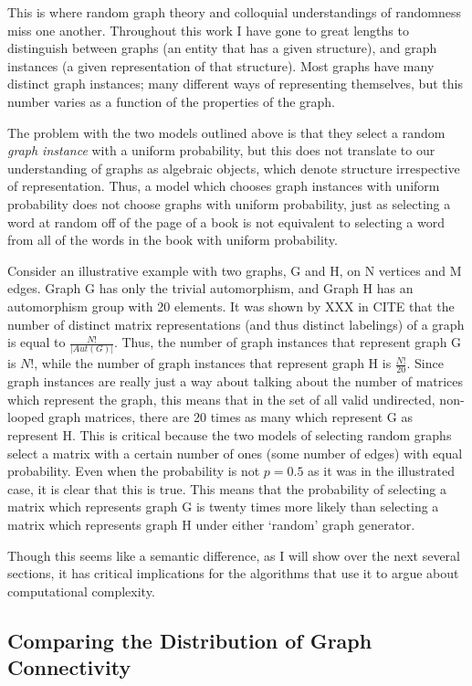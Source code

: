 This is where random graph theory and colloquial understandings of randomness miss one another.
Throughout this work I have gone to great lengths to distinguish between graphs (an entity that has a given structure), and graph instances (a given representation of that structure).
Most graphs have many distinct graph instances; many different ways of representing themselves, but this number varies as a function of the properties of the graph.

The problem with the two models outlined above is that they select a random \emph{graph instance} with a uniform probability, but this does not translate to our understanding of graphs as algebraic objects, which denote structure irrespective of representation.
Thus, a model which chooses graph instances with uniform probability does not choose graphs with uniform probability, just as selecting a word at random off of the page of a book is not equivalent to selecting a word from all of the words in the book with uniform probability.

Consider an illustrative example with two graphs, G and H, on N vertices and M edges.
Graph G has only the trivial automorphism, and Graph H has an automorphism group with 20 elements.
It was shown by XXX in CITE that the number of distinct matrix representations (and thus distinct labelings) of a graph is equal to $\frac{N!}{|Aut(G)|}$.
Thus, the number of graph instances that represent graph G is $N!$, while the number of graph instances that represent graph H is $\frac{N!}{20}$.
Since graph instances are really just a way about talking about the number of matrices which represent the graph, this means that in the set of all valid undirected, non-looped graph matrices, there are 20 times as many which represent G as represent H.
This is critical because the two models of selecting random graphs select a matrix with a certain number of ones (some number of edges) with equal probability.
Even when the probability is not $p=0.5$ as it was in the illustrated case, it is clear that this is true.
This means that the probability of selecting a matrix which represents graph G is twenty times more likely than selecting a matrix which represents graph H under either `random' graph generator.

Though this seems like a semantic difference, as I will show over the next several sections, it has critical implications for the algorithms that use it to argue about computational complexity.

\subsection{Comparing the Distribution of Graph Connectivity}

